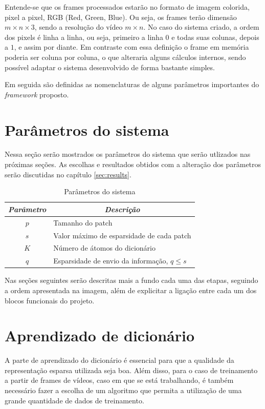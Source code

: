 \documentclass[cic,tc]{iiufrgs}
\begin{document}
Entende-se que os frames processados estarão no formato de imagem colorida,
pixel a pixel, RGB (Red, Green, Blue). 
Ou seja, os frames terão dimensão 
$m \times n \times 3$,
sendo a resolução do vídeo $m \times n$. 
No caso do sistema criado, a ordem dos pixels é 
linha a linha, ou seja, primeiro a linha $0$ e todas suas colunas, depois a $1$, e assim por diante.
Em contraste com essa definição o frame em memória poderia ser coluna por coluna, o que alteraria
alguns cálculos internos, sendo possível adaptar o sistema desenvolvido de forma bastante simples.

Em seguida são definidas as nomenclaturas de alguns parâmetros importantes do
\textit{framework} proposto.

\section{Parâmetros do sistema}
Nessa seção serão mostrados os parâmetros do sistema que serão utlizados nas próximas
seções. 
As escolhas e resultados obtidos com a alteração dos parâmetros serão discutidas no 
capítulo \autoref{sec:results}.

\begin{table}[h]
    \caption{Parâmetros do sistema}
    \centering
        \begin{tabular}{|c|p{10cm}|}
          \hline
          \multicolumn{1}{|c|}{\textit{Parâmetro}} & 
            \multicolumn{1}{c|}{\textit{Descrição}}\\
          \hline
          \hline
          $p$    & Tamanho do patch \\ 
          $s$    & Valor máximo de esparsidade de cada patch \\     
          $K$    & Número de átomos do dicionário \\
          $q$    & Esparsidade de envio da informação, $q \le s$ \\
          \hline
        \end{tabular}
    \label{tbl:params}
\end{table}

Nas seções seguintes serão descritas mais a fundo cada uma das etapas, seguindo a ordem
apresentada na imagem, além de explicitar a ligação entre cada um dos blocos funcionais
do projeto.

\section{Aprendizado de dicionário}
\label{sec:learn}
A parte de aprendizado do dicionário é essencial para que a qualidade da representação
esparsa utilizada seja boa.
Além disso, para o caso de treinamento a partir de frames de vídeos, caso em que se está
trabalhando, é também necessário fazer a escolha de um algoritmo que permita a utilização
de uma grande quantidade de dados de treinamento.
\end{document}
